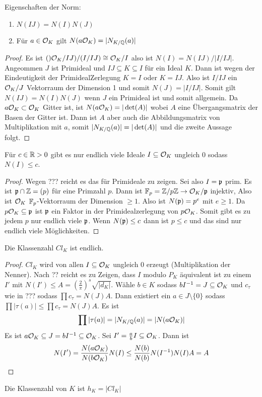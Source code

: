 \begin{Lemma}
	Eigenschaften der Norm:
	\begin{enumerate}
		\item \(N(IJ)=N(I)N(J)\)
		\item Für \(a\in \mathcal{O}_K\) gilt \(N(a\mathcal{O}_K)=|N_{K/\mathbb{Q}}(a)|\)
	\end{enumerate}
\end{Lemma}
\begin{proof}
	Es ist \(()\mathcal{O}_K/IJ)/(I/IJ)\cong \mathcal{O}_K/I\)
	also ist \(N(I)=N(IJ)/|I/IJ|\).
	Angeommen \(J\) ist Primideal und \(IJ\subseteq K\subseteq I\) für ein Ideal \(K\). Dann ist
	wegen der Eindeutigkeit der PrimidealZerlegung \(K=I\) oder \(K=IJ\).
	Also ist \(I/IJ\) ein \(\mathcal{O}_K/J\) Vektorraum der Dimension 1 und somit \(N(J)=|I/IJ|\).
	Somit gilt \(N(IJ)=N(I)N(J)\) wenn \(J\) ein Primideal ist
	und somit allgemein.
	Da \(a\mathcal{O}_K\subset \mathcal{O}_K\) Gitter ist,
	ist \(N(a\mathcal{O}_K)=|\det(A)|\) wobei \(A\) eine Übergangsmatrix der Basen der Gitter ist.
	Dann ist \(A\) aber auch die Abbildungsmatrix von Multiplikation mit \(a\), somit \(|N_{K/\mathbb{Q}}(a)|=|\det(A)|\) und die zweite Aussage folgt.
\end{proof}
\begin{Lemma}
	Für \(c\in \mathbb{R}>0\) gibt es nur endlich viele Ideale 
	\(I\subseteq \mathcal{O}_K\) ungleich 0 sodass
	\(N(I)\leq c\).
\end{Lemma}
\begin{proof}
	Wegen ??? reicht es das für Primideale zu zeigen.
	Sei also \(I=\mathfrak{p}\) prim. Es ist \(\mathfrak{p}\cap \mathbb{Z}=(p)\) für eine Primzahl \(p\).
	Dann ist \(\mathbb{F}_p=\mathbb{Z}/p\mathbb{Z}\to \mathcal{O}_K/\mathfrak{p}\) injektiv,
	Also ist \(\mathcal{O}_K\) \(\mathbb{F}_p\)-Vektorraum der Dimension \(\geq 1\).
	Also ist \(N(\mathfrak{p})=p^e\) mit \(e\geq 1\).
	Da \(p\mathcal{O}_K\subseteq\mathfrak{p}\) ist \(\mathfrak{p}\) ein Faktor in der Primidealzerlegung von \(p\mathcal{O}_K\).
	Somit gibt es zu jedem \(p\) nur endlich viele \(\mathfrak{p}\).
	Wenn \(N(\mathfrak{p})\leq c\) dann ist \(p\leq c\) und das sind nur endlich viele Möglichkeiten.
\end{proof}
\begin{Satz}
	Die Klassenzahl \(Cl_K\) ist endlich.
\end{Satz}
\begin{proof}
	\(Cl_K\) wird von allen \(I\subseteq \mathcal{O}_K\) ungleich 0 erzeugt (Multiplikation der Nenner).
	Nach ?? reicht es zu Zeigen, dass \(I\) modulo \(P_K\) äquivalent ist zu einem \(I'\) mit \(N(I')\leq A=(\frac 2 \pi)^s\sqrt{|d_K|}\).
	Wähle \(b\in K\) sodass \(bI^{-1}=J\subseteq\mathcal{O}_K\) und 
	\(c_\tau\) wie in ??? sodass \(\prod c_\tau=N(J)A\).
	Dann existiert ein \(a\in J\setminus\{0\}\) sodass
	\(\prod |\tau(a)|\leq \prod c_\tau=N(J)A\).
	Es ist
	\[\prod |\tau(a)|=|N_{K/\mathbb{Q}}(a)|=|N(a\mathcal{O}_K)|\]
	Es ist \(a\mathcal{O}_K\subseteq J=bI^{-1}\subseteq \mathcal{O}_K\).
	Sei \(I'=\frac a b I\subseteq \mathcal{O}_K\).
	Dann ist \[N(I')=\dfrac{N(a\mathcal{O}_K)}{N(b\mathcal{O}_K)}N(I)\leq \dfrac{N(b)}{N(b)}N(I^{-1})N(I)A=A\]
\end{proof}
\begin{Def}
	Die Klassenzahl von \(K\) ist \(h_K=|Cl_K|\)
\end{Def}
